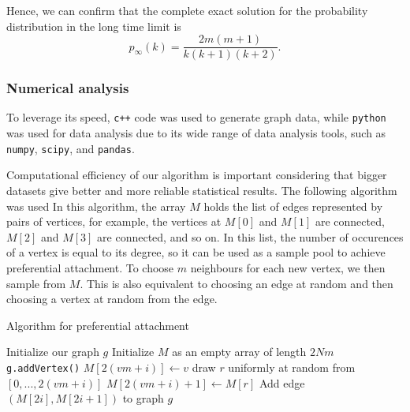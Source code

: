 Hence, we can confirm that the complete exact solution for the probability distribution in the long time limit is 
\begin{equation}
	p_{\infty}(k) = \frac{2m(m+1)}{k(k+1)(k+2)}.
	\label{eq:p-infinity-solution}
\end{equation}

\subsubsection{Numerical analysis}\label{subsection:ppa-numerical-analysis}

To leverage its speed, \texttt{c++} code was used to generate graph data, while \texttt{python} was used for data analysis due to its wide range of data analysis tools, such as \texttt{numpy}, \texttt{scipy}, and \texttt{pandas}. 

Computational efficiency of our algorithm is important considering that bigger datasets give better and more reliable statistical results. The following algorithm was used In this algorithm, the array $M$ holds the list of edges represented by pairs of vertices, for example, the vertices at $M[0]$ and $M[1]$ are connected, $M[2]$ and $M[3]$ are connected, and so on. In this list, the number of occurences of a vertex is equal to its degree, so it can be used as a sample pool to achieve preferential attachment. To choose $m$ neighbours for each new vertex, we then sample from $M$. This is also equivalent to choosing an edge at random and then choosing a vertex at random from the edge. 

\begin{algorithm}
\caption{Algorithm for preferential attachment}\label{alg:pa}
\begin{algorithmic}[1]
\State Initialize our graph $g$
\State Initialize $M$ as an empty array of length $2Nm$
	\State \texttt{g.addVertex()} 
		\State $M[2(vm + i)] \gets v$
		\State draw $r$ uniformly at random 
		\State from $[0, ..., 2(vm + i)]$
		\State $M[2(vm + i)+1] \gets M[r]$ 
	\EndFor
\EndFor
\State
{}
	\State Add edge $(M[2i], M[2i+1])$ to graph $g$
\EndFor
\end{algorithmic}
\end{algorithm}

